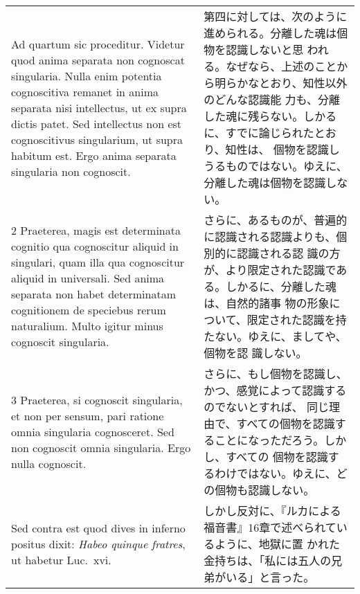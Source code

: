 \documentclass[10pt]{jsarticle} %
\begin{document}
\begin{longtable}{p{21em}p{21em}}
{\huge A}{\sc d quartum sic proceditur}. Videtur quod anima separata
non cognoscat singularia. Nulla enim potentia cognoscitiva remanet in
anima separata nisi intellectus, ut ex supra dictis patet. Sed
intellectus non est cognoscitivus singularium, ut supra habitum
est. Ergo anima separata singularia non cognoscit.


&

第四に対しては、次のように進められる。分離した魂は個物を認識しないと思
われる。なぜなら、上述のことから明らかなとおり、知性以外のどんな認識能
力も、分離した魂に残らない。しかるに、すでに論じられたとおり、知性は、
個物を認識しうるものではない。ゆえに、分離した魂は個物を認識しない。


\\




2 {\sc Praeterea}, magis est determinata cognitio qua cognoscitur
aliquid in singulari, quam illa qua cognoscitur aliquid in
universali. Sed anima separata non habet determinatam cognitionem de
speciebus rerum naturalium. Multo igitur minus cognoscit singularia.


&


さらに、あるものが、普遍的に認識される認識よりも、個別的に認識される認
識の方が、より限定された認識である。しかるに、分離した魂は、自然的諸事
物の形象について、限定された認識を持たない。ゆえに、ましてや、個物を認
識しない。

\\





3 {\sc Praeterea}, si cognoscit singularia, et non per sensum, pari
ratione omnia singularia cognosceret. Sed non cognoscit omnia
singularia. Ergo nulla cognoscit.


&


さらに、もし個物を認識し、かつ、感覚によって認識するのでないとすれば、
同じ理由で、すべての個物を認識することになっただろう。しかし、すべての
個物を認識するわけではない。ゆえに、どの個物も認識しない。
\\





{\sc Sed contra est} quod dives in inferno positus dixit: {\it Habeo
quinque fratres}, ut habetur Luc.~{\sc xvi}.


&

しかし反対に、『ルカによる福音書』16章で述べられているように、地獄に置
かれた金持ちは、「私には五人の兄弟がいる」と言った。


\end{longtable}
\end{document}
